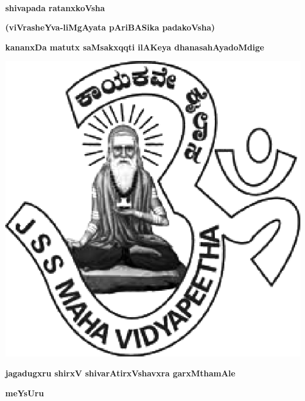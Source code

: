 ~\thispagestyle{empty}

\vfill

\begin{center}
{\fontsize{50}{50}\selectfont\bfseries shivapada ratanxkoVsha}\relax

\medskip

{\LARGE\bfseries (viVrasheYva-liMgAyata pAriBASika padakoVsha)}
\end{center}

\vfill

\centerline{\Large\bfseries kananxDa matutx saMsakxqqti ilAKeya dhanasahAyadoMdige}\relax

\vfill


\centerline{\includegraphics[scale=.3]{JSSlogo.eps}}

\medskip

\centerline{\large\bfseries jagadugxru shirxV shivarAtirxVshavxra  garxMthamAle}

\smallskip

\centerline{\large\bfseries meYsUru}
